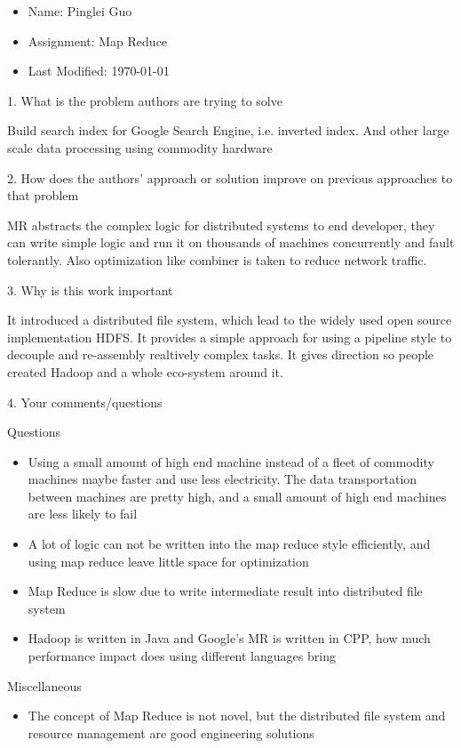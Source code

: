 \documentclass[12pt,a4paper,oneside]{article}
\begin{document}
\begin{itemize}
  \item Name: Pinglei Guo
  \item Assignment: Map Reduce
  \item Last Modified: \today
\end{itemize}

1. What is the problem authors are trying to solve

\medskip

Build search index for Google Search Engine, i.e. inverted index. And other large
scale data processing using commodity hardware

\bigskip

2. How does the authors’ approach or solution improve on previous approaches to that problem

\medskip

MR abstracts the complex logic for distributed systems to end developer, they can
write simple logic and run it on thousands of machines concurrently and fault tolerantly.
Also optimization like combiner is taken to reduce network traffic.

\bigskip

3. Why is this work important

\medskip

It introduced a distributed file system, which lead to the widely used open source
implementation HDFS. It provides a simple approach for using a pipeline style to
decouple and re-assembly realtively complex tasks.
It gives direction so people created Hadoop and a whole eco-system around it.

\bigskip

4. Your comments/questions

\medskip

Questions

\begin{itemize}
  \item Using a small amount of high end machine instead of a fleet of commodity machines
maybe faster and use less electricity. The data transportation between machines are pretty
high, and a small amount of high end machines are less likely to fail
  \item A lot of logic can not be written into the map reduce style efficiently,
and using map reduce leave little space for optimization
  \item Map Reduce is slow due to write intermediate result into distributed file system
  \item Hadoop is written in Java and Google's MR is written in CPP, how much performance impact
does using different languages bring
\end{itemize}

Miscellaneous

\begin{itemize}
  \item The concept of Map Reduce is not novel, but the distributed file system and resource management are good engineering solutions
\end{itemize}
\end{document}
